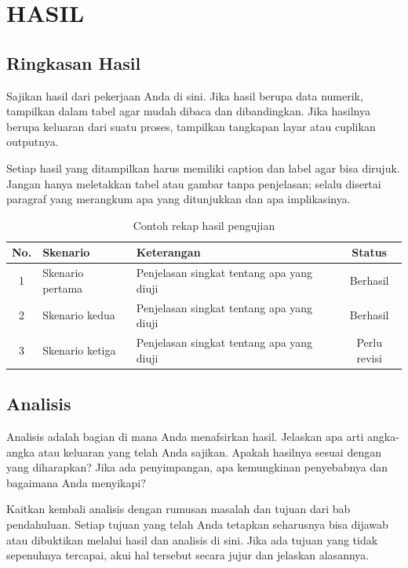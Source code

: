 \chapter{HASIL}

\section{Ringkasan Hasil}
Sajikan hasil dari pekerjaan Anda di sini. Jika hasil berupa data numerik, tampilkan dalam tabel agar mudah dibaca dan dibandingkan. Jika hasilnya berupa keluaran dari suatu proses, tampilkan tangkapan layar atau cuplikan outputnya.

Setiap hasil yang ditampilkan harus memiliki caption dan label agar bisa dirujuk. Jangan hanya meletakkan tabel atau gambar tanpa penjelasan; selalu disertai paragraf yang merangkum apa yang ditunjukkan dan apa implikasinya.

\begin{table}[H]
    \centering
    \caption{Contoh rekap hasil pengujian}
    \label{tab:hasil}
    \begin{tabularx}{\textwidth}{| c | l | X | c |}
        \hline
        \textbf{No.} & \textbf{Skenario} & \textbf{Keterangan} & \textbf{Status} \\ \hline
        1 & Skenario pertama & Penjelasan singkat tentang apa yang diuji & Berhasil \\ \hline
        2 & Skenario kedua & Penjelasan singkat tentang apa yang diuji & Berhasil \\ \hline
        3 & Skenario ketiga & Penjelasan singkat tentang apa yang diuji & Perlu revisi \\ \hline
    \end{tabularx}
\end{table}

\section{Analisis}
Analisis adalah bagian di mana Anda menafsirkan hasil. Jelaskan apa arti angka-angka atau keluaran yang telah Anda sajikan. Apakah hasilnya sesuai dengan yang diharapkan? Jika ada penyimpangan, apa kemungkinan penyebabnya dan bagaimana Anda menyikapi?

Kaitkan kembali analisis dengan rumusan masalah dan tujuan dari bab pendahuluan. Setiap tujuan yang telah Anda tetapkan seharusnya bisa dijawab atau dibuktikan melalui hasil dan analisis di sini. Jika ada tujuan yang tidak sepenuhnya tercapai, akui hal tersebut secara jujur dan jelaskan alasannya.

